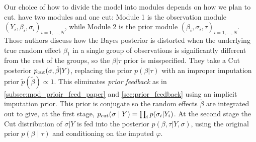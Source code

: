 Our choice of how to divide the model into modules depends on how we plan to cut.
\cite{Liu2009modularization} have two modules and one cut: Module 1 is the observation module $(Y_{i},\beta_i,\sigma_i)_{i=1,...,N}$, while Module 2 is the prior module $(\beta_i,\sigma_i,\tau)_{i=1,...,N}$. Those authors discuss how the Bayes posterior is distorted when the underlying true random effect $\beta_1$ in a single group of observations is significantly different from the rest of the groups, so the $\beta|\tau$ prior is misspecified. They take a Cut posterior $p_{\operatorname{\text{cut}}}(\sigma,\tilde\beta|Y)$, replacing the prior $p(\beta|\tau)$ with an improper imputation prior $\tilde p(\tilde\beta)\propto 1$. This eliminates \emph{prior feedback} as in \cref{subsec:mod_prioir_feed_paper} and \cref{sec:prior_feedback} using an implicit imputation prior. This prior is conjugate so the random effects $\tilde\beta$ are integrated out to give, at the first stage, $p_{\operatorname{\text{cut}}}(\sigma \mid Y)=\prod_i p(\sigma_i|Y_i)$. At the second stage the Cut distribution of $\sigma|Y$ is fed into the posterior $p(\beta,\tau|Y,\sigma)$, using the original prior $p(\beta \mid \tau)$ and conditioning on the imputed $\varphi$.



